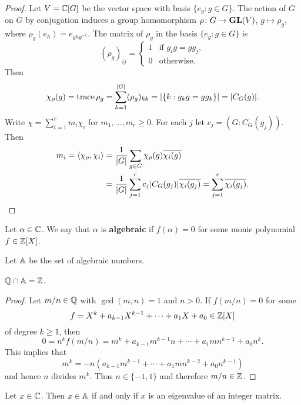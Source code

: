 \begin{proof}
    Let $V=\mathbb{C}[G]$ be the vector space with basis $\{e_g:g\in G\}$. 
    The action of $G$ on $G$ by conjugation induces a group homomorphism 
    $\rho\colon G\to\mathbf{GL}(V)$, $g\mapsto\rho_g$, where
    $\rho_g(e_h)=e_{ghg^{-1}}$. The matrix of $\rho_g$ 
    in the basis $\{e_g:g\in G\}$ is
    \[
    (\rho_g)_{ij}=\begin{cases}
        1 & \text{if $g_ig=gg_j$},\\
        0 & \text{otherwise}.
        \end{cases}
    \]
    Then
    \[
    \chi_{\rho}(g)=\operatorname{trace}\rho_g=\sum_{k=1}^{|G|}(\rho_g)_{kk}
    =|\{k:g_kg=gg_k\}|=|C_G(g)|.
    \]
    Write $\chi=\sum_{i=1}^rm_i\chi_i$ for $m_1,\dots,m_r\geq0$. 
    For each $j$ let $c_j=(G:C_G(g_j))$. Then
    \begin{align*}
    m_i=\langle\chi_{\rho},\chi_i\rangle
    &=\frac{1}{|G|}\sum_{g\in G}\chi_{\rho}(g)\overline{\chi_i(g)}\\
    &=\frac{1}{|G|}\sum_{j=1}^r c_j|C_G(g_j)|\overline{\chi_i(g_j)}
    =\sum_{j=1}^r\overline{\chi_i(g_j)}.\qedhere
    \end{align*}
\end{proof}


\begin{definition}
    Let $\alpha\in\mathbb{C}$. We say that $\alpha$ is \textbf{algebraic}
    if $f(\alpha)=0$ for some monic polynomial $f\in\mathbb{Z}[X]$. 
\end{definition}

Let $\mathbb{A}$ be the set of algebraic numbers.

\begin{proposition}
    $\mathbb{Q}\cap\mathbb{A}=\mathbb{Z}$. 
\end{proposition}

\begin{proof}
    Let $m/n\in\mathbb{Q}$ with $\gcd(m,n)=1$ and $n>0$. If 
    $f(m/n)=0$ for some 
    \[
    f=X^k+a_{k-1}X^{k-1}+\cdots+a_1X+a_0\in\mathbb{Z}[X]
    \]
    of degree $k\geq1$, then
    \[
    0=n^kf(m/n)=m^k+a_{k-1}m^{k-1}n+\cdots+a_1mn^{k-1}+a_0n^k.
    \]
    This implies that 
    \[
        m^k=-n\left(a_{k-1}m^{k-1}+\cdots+a_1mn^{k-2}+a_0n^{k-1}\right)
    \]
    and hence $n$ divides $m^k$. Thus $n\in\{-1,1\}$ and 
    therefore $m/n\in\mathbb{Z}$.
\end{proof}

\begin{proposition}
    Let $x\in\mathbb{C}$. Then $x\in\mathbb{A}$ if and only if $x$ is an eigenvalue of
    an integer matrix.
\end{proposition}

